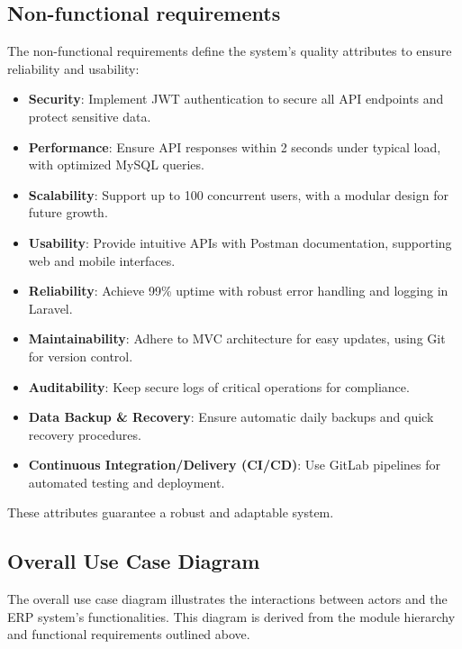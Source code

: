 \subsection{Non-functional requirements}
The non-functional requirements define the system's quality attributes to ensure reliability and usability:

\begin{itemize}
    \item \textbf{Security}: Implement JWT authentication to secure all API endpoints and protect sensitive data.
    \item \textbf{Performance}: Ensure API responses within 2 seconds under typical load, with optimized MySQL queries.
    \item \textbf{Scalability}: Support up to 100 concurrent users, with a modular design for future growth.
    \item \textbf{Usability}: Provide intuitive APIs with Postman documentation, supporting web and mobile interfaces.
    \item \textbf{Reliability}: Achieve 99\% uptime with robust error handling and logging in Laravel.
    \item \textbf{Maintainability}: Adhere to MVC architecture for easy updates, using Git for version control.
    \item \textbf{Auditability}: Keep secure logs of critical operations for compliance.
    \item \textbf{Data Backup \& Recovery}: Ensure automatic daily backups and quick recovery procedures.
    \item \textbf{Continuous Integration/Delivery (CI/CD)}: Use GitLab pipelines for automated testing and deployment.
\end{itemize}

These attributes guarantee a robust and adaptable system.

\subsection{Overall Use Case Diagram}
The overall use case diagram illustrates the interactions between actors and the ERP system's functionalities. This diagram is derived from the module hierarchy and functional requirements outlined above.

